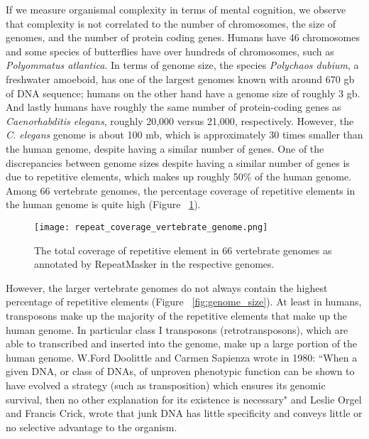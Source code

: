 If we measure organismal complexity in terms of mental cognition, we observe that complexity is not correlated to the number of chromosomes, the size of genomes, and the number of protein coding genes. Humans have 46 chromosomes and some species of butterflies have over hundreds of chromosomes, such as \textit{Polyommatus atlantica}. In terms of genome size, the species \textit{Polychaos dubium}, a freshwater amoeboid, has one of the largest genomes known with around 670 gb of DNA sequence; humans on the other hand have a genome size of roughly 3 gb. And lastly humans have roughly the same number of protein-coding genes as \textit{Caenorhabditis elegans}, roughly 20,000 versus 21,000, respectively. However, the \textit{C. elegans} genome is about 100 mb\cite{celegans1998sequencing}, which is approximately 30 times smaller than the human genome, despite having a similar number of genes. One of the discrepancies between genome sizes despite having a similar number of genes is due to repetitive elements, which makes up roughly 50\% of the human genome. Among 66 vertebrate genomes, the percentage coverage of repetitive elements in the human genome is quite high (Figure ~\ref{fig:repeat_coverage_vertebrate_genome}).

\begin{figure}[h]
   \centering
   \texttt{[image: repeat\_coverage\_vertebrate\_genome.png]}
   \caption[Coverage of repetitive elements in vertebrate genomes]{The total coverage of repetitive element in 66 vertebrate genomes as annotated by RepeatMasker in the respective genomes\cite{tang2014repcoverage}.}
   \label{fig:repeat_coverage_vertebrate_genome}
\end{figure}

However, the larger vertebrate genomes do not always contain the highest percentage of repetitive elements (Figure ~\ref{fig:genome_size}). At least in humans, transposons make up the majority of the repetitive elements that make up the human genome. In particular class I transposons (retrotransposons), which are able to transcribed and inserted into the genome, make up a large portion of the human genome. W.Ford Doolittle and Carmen Sapienza wrote in 1980\cite{doolittle1980selfish}: ``When a given DNA, or class of DNAs, of unproven phenotypic function can be shown to have evolved a strategy (such as transposition) which ensures its genomic survival, then no other explanation for its existence is necessary" and Leslie Orgel and Francis Crick, wrote that junk DNA has little specificity and conveys little or no selective advantage to the organism\cite{orgel1980selfish}.

